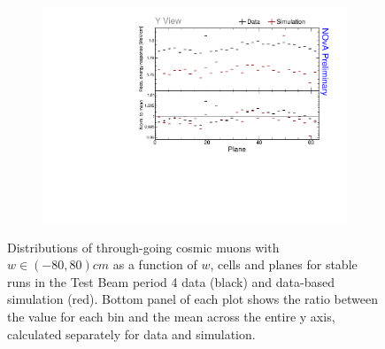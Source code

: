 \begin{figure}[!ht]
\begin{subfigure}{0.495\textwidth}
    \includegraphics[width=\linewidth]{Plots/PCListAna/DataAndSim_recomevcm_ts_plane_y.pdf}
  \end{subfigure}
  \caption[Validation plots for through-going muons as a function of w, cell and plane]{Distributions of through-going cosmic muons with $w\in\left(-80,80\right)\unit{cm}$ as a function of $w$, cells and planes for stable runs in the Test Beam period 4 data (black) and data-based simulation (red). Bottom panel of each plot shows the ratio between the value for each bin and the mean across the entire y axis, calculated separately for data and simulation.}
  \label{fig:ValidPCListAnaProfDists}
\end{figure}

